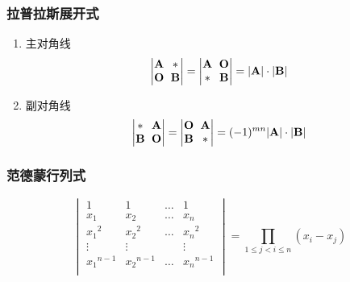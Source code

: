 \documentclass[a4paper,12pt]{article}
\begin{document}
    \subsubsection{拉普拉斯展开式}

    \begin{enumerate}
        \item 主对角线
        \[
            \renewcommand{\arraystretch}{1} %
            \setlength{\arraycolsep}{3pt}     %
            \begin{vmatrix}
                \mathbf{A} & *          \\
                \mathbf{O} & \mathbf{B}
            \end{vmatrix}
            = \begin{vmatrix}
                  \mathbf{A} & \mathbf{O} \\
                  *          & \mathbf{B}
            \end{vmatrix}
            = |\mathbf{A}| \cdot |\mathbf{B}|
        \]
        \item 副对角线
        \[
            \renewcommand{\arraystretch}{1} %
            \setlength{\arraycolsep}{3pt}     %
            \begin{vmatrix}
                *          & \mathbf{A} \\
                \mathbf{B} & \mathbf{O}
            \end{vmatrix}
            = \begin{vmatrix}
                  \mathbf{O} & \mathbf{A} \\
                  \mathbf{B} & *
            \end{vmatrix}
            = (-1)^{mn}|\mathbf{A}| \cdot |\mathbf{B}|
        \]
    \end{enumerate}

    \subsubsection{范德蒙行列式}

    \[
        \begin{vmatrix}
            1           & 1           & \dots & 1           \\
            x_1         & x_2         & \dots & x_n \\
            {x_1}^{2}   & {x_2}^2     & \dots & {x_n}^2     \\
            \vdots      & \vdots      &       & \vdots \\
            {x_1}^{n-1} & {x_2}^{n-1} & \dots & {x_n}^{n-1} \\
        \end{vmatrix}
        = \prod_{1 \le j < i \le n} (x_{i} - x_{j})
    \]
\end{document}
